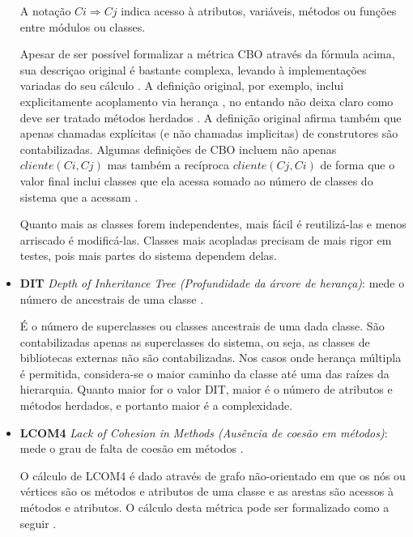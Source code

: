 \begin{itemize}
A notação $ Ci \Rightarrow Cj $ indica acesso à atributos, variáveis, métodos ou funções
entre módulos ou classes.

Apesar de ser possível formalizar a métrica CBO através da fórmula acima, sua descriçao original é
bastante complexa, levando à implementações variadas do seu cálculo
\cite{Lincke2008}. A definição original, por exemplo, inclui explicitamente
acoplamento via herança \cite{Harrison1998}, no entando não deixa claro como
deve ser tratado métodos herdados \cite{Briand1999}. A definição original
afirma também que apenas chamadas explícitas (e não chamadas implicitas) de
construtores são contabilizadas. Algumas definições de CBO incluem não apenas $
cliente(Ci, Cj) $ mas também a recíproca $ cliente(Cj, Ci) $ de forma que o valor
final inclui classes que ela acessa somado ao número de classes do sistema que
a acessam \cite{Sant2008}.

Quanto mais as classes forem independentes, mais fácil é reutilizá-las e menos
arriscado é modificá-las. Classes mais acopladas precisam de mais rigor em
testes, pois mais partes do sistema dependem delas.

  \item {\bf DIT} {\it Depth of Inheritance Tree (Profundidade da árvore de
    herança)}: mede o número de ancestrais de uma classe \cite{Chidamber1994}.

É o número de superclasses ou classes ancestrais de uma dada classe. São
contabilizadas apenas as superclasses do sistema, ou seja, as classes de
bibliotecas externas não são contabilizadas. Nos casos onde herança múltipla é
permitida, considera-se o maior caminho da classe até uma das raízes da
hierarquia. Quanto maior for o valor DIT, maior é o número de atributos e
métodos herdados, e portanto maior é a complexidade.


  \item {\bf LCOM4} {\it Lack of Cohesion in Methods (Ausência de coesão em
    métodos)}: mede o grau de falta de coesão em métodos \cite{Hitz1995}.

O cálculo de LCOM4 é dado através de grafo não-orientado em que os nós ou
vértices são os métodos e atributos de uma classe e as arestas são acessos à
métodos e atributos. O cálculo desta métrica pode ser formalizado como a
seguir \cite{Silva2012}.


\end{itemize}

